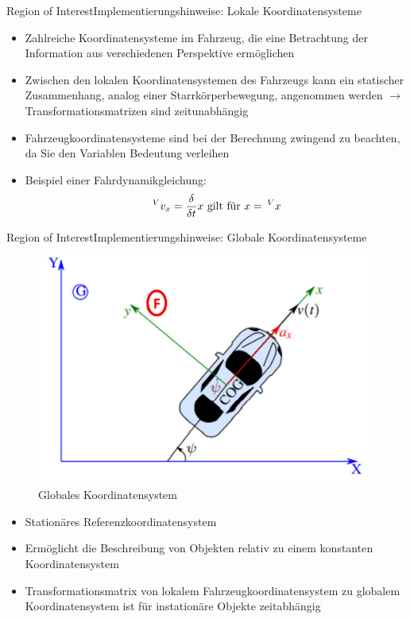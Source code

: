 \documentclass[169, handout	]{THIbeamer} %
\begin{document}
	\begin{frame}{Region of Interest}{Implementierungshinweise: Lokale Koordinatensysteme}
		\begin{itemize}
			\item Zahlreiche Koordinatensysteme im Fahrzeug, die eine Betrachtung der Information aus verschiedenen Perspektive ermöglichen
			\item Zwischen den lokalen Koordinatensystemen des Fahrzeugs kann ein statischer Zusammenhang, analog einer Starrkörperbewegung, angenommen werden $\rightarrow$ Transformationsmatrizen sind zeitunabhängig
			\item Fahrzeugkoordinatensysteme sind bei der Berechnung zwingend zu beachten, da Sie den Variablen Bedeutung verleihen
			\item Beispiel einer Fahrdynamikgleichung:
			\begin{equation}
				\hspace*{0.2em}^V\vspace*{-0.2em}v_{x} = \frac{\delta}{\delta t}x \text{ gilt für } x =\hspace*{0.2em}^V\vspace*{-0.2em}x
			\end{equation}
					
		\end{itemize}
	\end{frame}
	\begin{frame}{Region of Interest}{Implementierungshinweise: Globale Koordinatensysteme}	
		\begin{figure}
			\includegraphics[scale=0.35]{required/Globales Koordinatensystem.jpg}
			\caption{Globales Koordinatensystem}
        	\label{Globales Koordinatensystem}
		\end{figure}
		\begin{itemize}
			\item Stationäres Referenzkoordinatensystem
			\item Ermöglicht die Beschreibung von Objekten relativ zu einem konstanten Koordinatensystem
			\item Transformationsmatrix von lokalem Fahrzeugkoordinatensystem zu globalem Koordinatensystem ist für instationäre Objekte zeitabhängig
		\end{itemize}					
	\end{frame}
\end{document}
